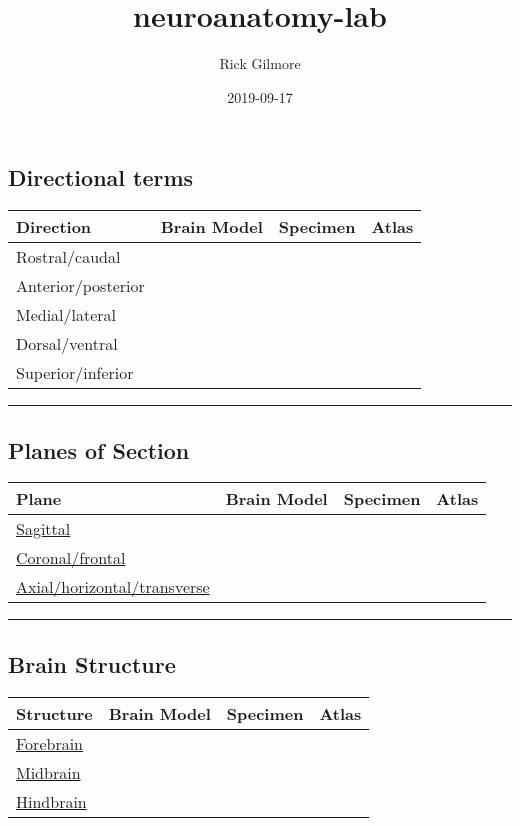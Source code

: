 \documentclass[]{article}
\title{neuroanatomy-lab}
\author{Rick Gilmore}
\date{2019-09-17}
\begin{document}
\maketitle

\hypertarget{directional-terms}{%
\subsection{Directional terms}\label{directional-terms}}

\begin{longtable}[]{@{}llll@{}}
\toprule
Direction & Brain Model & Specimen & Atlas\tabularnewline
\midrule
\endhead
Rostral/caudal & & &\tabularnewline
Anterior/posterior & & &\tabularnewline
Medial/lateral & & &\tabularnewline
Dorsal/ventral & & &\tabularnewline
Superior/inferior & & &\tabularnewline
\bottomrule
\end{longtable}

\begin{center}\rule{0.5\linewidth}{\linethickness}\end{center}

\hypertarget{planes-of-section}{%
\subsection{Planes of Section}\label{planes-of-section}}

\begin{longtable}[]{@{}llll@{}}
\toprule
Plane & Brain Model & Specimen & Atlas\tabularnewline
\midrule
\endhead
\href{https://en.wikipedia.org/wiki/Sagittal_plane}{Sagittal} & &
&\tabularnewline
\href{https://en.wikipedia.org/wiki/Coronal_plane}{Coronal/frontal} & &
&\tabularnewline
\href{https://en.wikipedia.org/wiki/Transverse_plane}{Axial/horizontal/transverse}
& & &\tabularnewline
\bottomrule
\end{longtable}

\begin{center}\rule{0.5\linewidth}{\linethickness}\end{center}

\hypertarget{brain-structure}{%
\subsection{Brain Structure}\label{brain-structure}}

\begin{longtable}[]{@{}llll@{}}
\toprule
Structure & Brain Model & Specimen & Atlas\tabularnewline
\midrule
\endhead
\href{https://en.wikipedia.org/wiki/Prosencephalon}{Forebrain} & &
&\tabularnewline
\href{https://en.wikipedia.org/wiki/Midbrain}{Midbrain} & &
&\tabularnewline
\href{https://en.wikipedia.org/wiki/Rhombencephalon}{Hindbrain} & &
&\tabularnewline
\bottomrule
\end{longtable}
\end{document}
